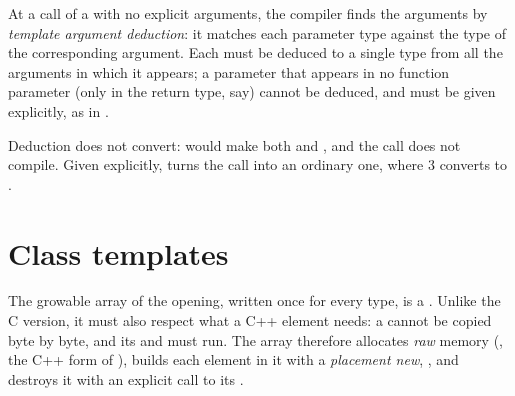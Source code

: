 \label{lst:b2:cpp-templates:max}

\label{out:b2:cpp-templates:max}

\begin{definition}\label{def:b2:cpp-templates:deduction}
At a call of a  with no explicit arguments, the compiler finds the  arguments by
\emph{template argument deduction}: it matches each parameter type against the
type of the corresponding argument. Each  must be deduced to a single type from all the arguments
in which it appears; a parameter that appears in no function parameter (only in the return type, say) cannot be
deduced, and must be given explicitly, as in .
\end{definition}

Deduction does not convert:  would make  both  and , and the call
does not compile. Given explicitly,  turns the call into an ordinary one, where 3 converts to
.

\section{Class templates}\label{sec:b2:cpp-templates:classes}

The growable array of the opening, written once for every type, is a . Unlike the C version, it must
also respect what a C++ element needs: a  cannot be copied byte by byte, and its  and
 must run. The array therefore allocates \emph{raw} memory (, the C++ form of
), builds each element in it with a \emph{placement new}, , and destroys it
with an explicit call to its .

\label{lst:b2:cpp-templates:vec}

